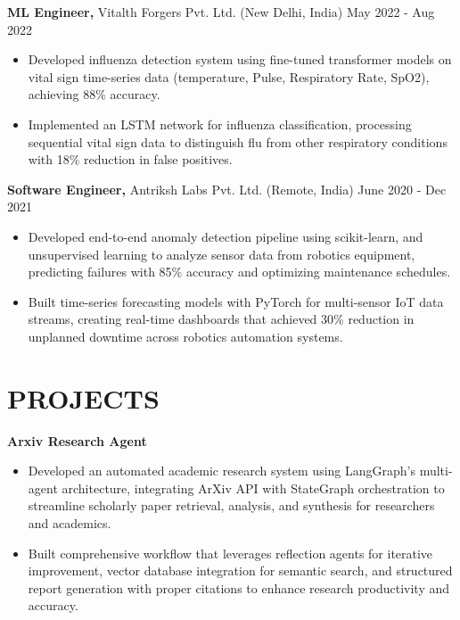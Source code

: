 \documentclass[10pt, letterpaper]{article}
\begin{document}
\textbf{ML Engineer,} Vitalth Forgers Pvt. Ltd. (New Delhi, India)  \hfill May 2022 - Aug 2022 
\vspace{-0.5em}
\begin{itemize}[leftmargin=*, itemsep=0pt, topsep=0pt, partopsep=0pt, parsep=0pt]
  \item Developed influenza detection system using fine-tuned transformer models on vital sign time-series data (temperature, Pulse, Respiratory Rate, SpO2), achieving 88\% accuracy.
  \item Implemented an LSTM network for influenza classification, processing sequential vital sign data to distinguish flu from other respiratory conditions with 18\% reduction in false positives.
\end{itemize}
\textbf{Software Engineer,} Antriksh Labs Pvt. Ltd. (Remote, India) \hfill June 2020 - Dec 2021 
\vspace{-0.5em}
\begin{itemize}[leftmargin=*, itemsep=0pt, topsep=0pt, partopsep=0pt, parsep=0pt]
\item Developed end-to-end anomaly detection pipeline using scikit-learn, and unsupervised learning to analyze sensor data from robotics equipment, predicting failures with 85\% accuracy and optimizing maintenance schedules.
\item Built time-series forecasting models with PyTorch for multi-sensor IoT data streams, creating real-time dashboards that achieved 30\% reduction in unplanned downtime across robotics automation systems.
\end{itemize}

\section{PROJECTS}

\textbf{Arxiv Research Agent} 
\vspace{-0.5em}
\begin{itemize}[leftmargin=*, itemsep=0pt, topsep=0pt, partopsep=0pt, parsep=0pt]
\item Developed an automated academic research system using LangGraph's multi-agent architecture, integrating ArXiv API with StateGraph orchestration to streamline scholarly paper retrieval, analysis, and synthesis for researchers and academics.
\item Built comprehensive workflow  that leverages reflection agents for iterative improvement, vector database integration for semantic search, and structured report generation with proper citations to enhance research productivity and accuracy.
\end{itemize}
\end{document}
